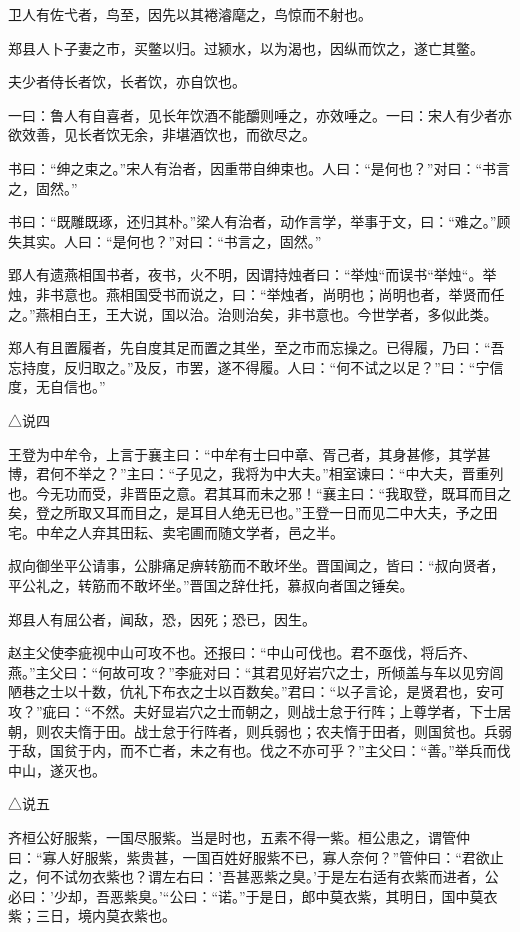\documentclass[]{article}
\begin{document}
卫人有佐弋者，鸟至，因先以其裷濬麾之，鸟惊而不射也。

郑县人卜子妻之市，买鳖以归。过颍水，以为渴也，因纵而饮之，遂亡其鳖。

夫少者侍长者饮，长者饮，亦自饮也。

一曰：鲁人有自喜者，见长年饮酒不能釂则唾之，亦效唾之。一曰：宋人有少者亦欲效善，见长者饮无余，非堪酒饮也，而欲尽之。

书曰：``绅之束之。''宋人有治者，因重带自绅束也。人曰：``是何也？''对曰：``书言之，固然。''

书曰：``既雕既琢，还归其朴。''梁人有治者，动作言学，举事于文，曰：``难之。''顾失其实。人曰：``是何也？''对曰：``书言之，固然。''

郢人有遗燕相国书者，夜书，火不明，因谓持烛者曰：``举烛``而误书``举烛``。举烛，非书意也。燕相国受书而说之，曰：``举烛者，尚明也；尚明也者，举贤而任之。''燕相白王，王大说，国以治。治则治矣，非书意也。今世学者，多似此类。

郑人有且置履者，先自度其足而置之其坐，至之市而忘操之。已得履，乃曰：``吾忘持度，反归取之。''及反，市罢，遂不得履。人曰：``何不试之以足？''曰：``宁信度，无自信也。''

△说四

王登为中牟令，上言于襄主曰：``中牟有士曰中章、胥己者，其身甚修，其学甚博，君何不举之？''主曰：``子见之，我将为中大夫。''相室谏曰：``中大夫，晋重列也。今无功而受，非晋臣之意。君其耳而未之邪！``襄主曰：``我取登，既耳而目之矣，登之所取又耳而目之，是耳目人绝无已也。''王登一日而见二中大夫，予之田宅。中牟之人弃其田耘、卖宅圃而随文学者，邑之半。

叔向御坐平公请事，公腓痛足痹转筋而不敢坏坐。晋国闻之，皆曰：``叔向贤者，平公礼之，转筋而不敢坏坐。''晋国之辞仕托，慕叔向者国之锤矣。

郑县人有屈公者，闻敌，恐，因死；恐已，因生。

赵主父使李疵视中山可攻不也。还报曰：``中山可伐也。君不亟伐，将后齐、燕。''主父曰：``何故可攻？''李疵对曰：``其君见好岩穴之士，所倾盖与车以见穷闾陋巷之士以十数，伉礼下布衣之士以百数矣。''君曰：``以子言论，是贤君也，安可攻？''疵曰：``不然。夫好显岩穴之士而朝之，则战士怠于行阵；上尊学者，下士居朝，则农夫惰于田。战士怠于行阵者，则兵弱也；农夫惰于田者，则国贫也。兵弱于敌，国贫于内，而不亡者，未之有也。伐之不亦可乎？''主父曰：``善。''举兵而伐中山，遂灭也。

△说五

齐桓公好服紫，一国尽服紫。当是时也，五素不得一紫。桓公患之，谓管仲曰：``寡人好服紫，紫贵甚，一国百姓好服紫不已，寡人奈何？''管仲曰：``君欲止之，何不试勿衣紫也？谓左右曰：'吾甚恶紫之臭。'于是左右适有衣紫而进者，公必曰：'少却，吾恶紫臭。'``公曰：``诺。''于是日，郎中莫衣紫，其明日，国中莫衣紫；三日，境内莫衣紫也。
\end{document}

